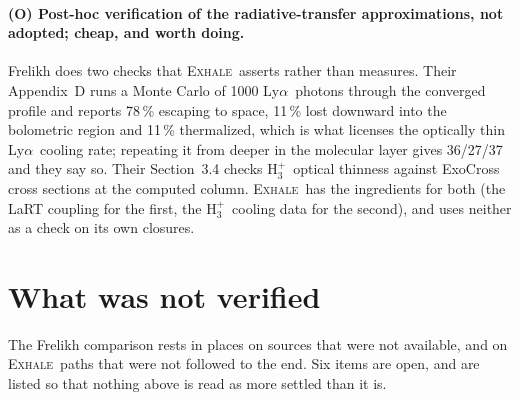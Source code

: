 \documentclass[english,a4paper]{my_memo}
\newcommand{\EXHALE}{\textsc{Exhale}}
\newcommand{\Lya}{Ly$\alpha$}
\newcommand{\Hth}{\ensuremath{\mathrm{H}_3^+}}
\begin{document}
\paragraph{(O) Post-hoc verification of the radiative-transfer approximations,
not adopted; cheap, and worth doing.} Frelikh does two checks that
\EXHALE\ asserts rather than measures. Their Appendix~D runs a Monte Carlo of
1000 \Lya\ photons through the converged profile and reports 78\,\% escaping
to space, 11\,\% lost downward into the bolometric region and 11\,\%
thermalized, which is what licenses the optically thin \Lya\ cooling rate;
repeating it from deeper in the molecular layer gives 36/27/37 and they say so.
Their Section~3.4 checks \Hth\ optical thinness against ExoCross cross
sections at the computed column. \EXHALE\ has the ingredients for both (the
LaRT coupling for the first, the \Hth\ cooling data for the second), and
uses neither as a check on its own closures.

\section{What was not verified}
\label{sec:unverified}

The Frelikh comparison rests in places on sources that were not available, and
on \EXHALE\ paths that were not followed to the end. Six items are open, and
are listed so that nothing above is read as more settled than it is.
\end{document}
